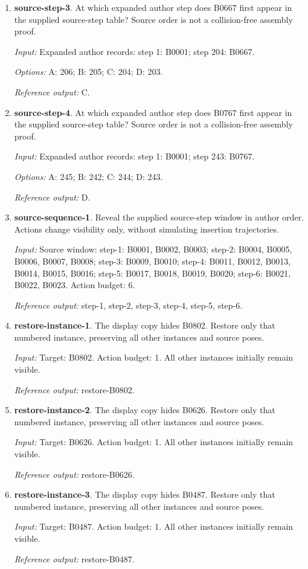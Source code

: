 \begin{enumerate}
\item \textbf{source-step-3}. At which expanded author step does B0667 first appear in the supplied source-step table? Source order is not a collision-free assembly proof.\par {\small \textit{Input:} Expanded author records: step 1: B0001; step 204: B0667. \par\textit{Options:} A: 206; B: 205; C: 204; D: 203. \par\textit{Reference output:} C.}
\item \textbf{source-step-4}. At which expanded author step does B0767 first appear in the supplied source-step table? Source order is not a collision-free assembly proof.\par {\small \textit{Input:} Expanded author records: step 1: B0001; step 243: B0767. \par\textit{Options:} A: 245; B: 242; C: 244; D: 243. \par\textit{Reference output:} D.}
\item \textbf{source-sequence-1}. Reveal the supplied source-step window in author order. Actions change visibility only, without simulating insertion trajectories.\par {\small \textit{Input:} Source window: step-1: B0001, B0002, B0003; step-2: B0004, B0005, B0006, B0007, B0008; step-3: B0009, B0010; step-4: B0011, B0012, B0013, B0014, B0015, B0016; step-5: B0017, B0018, B0019, B0020; step-6: B0021, B0022, B0023. Action budget: 6. \par\textit{Reference output:} step-1, step-2, step-3, step-4, step-5, step-6.}
\item \textbf{restore-instance-1}. The display copy hides B0802. Restore only that numbered instance, preserving all other instances and source poses.\par {\small \textit{Input:} Target: B0802. Action budget: 1. All other instances initially remain visible. \par\textit{Reference output:} restore-B0802.}
\item \textbf{restore-instance-2}. The display copy hides B0626. Restore only that numbered instance, preserving all other instances and source poses.\par {\small \textit{Input:} Target: B0626. Action budget: 1. All other instances initially remain visible. \par\textit{Reference output:} restore-B0626.}
\item \textbf{restore-instance-3}. The display copy hides B0487. Restore only that numbered instance, preserving all other instances and source poses.\par {\small \textit{Input:} Target: B0487. Action budget: 1. All other instances initially remain visible. \par\textit{Reference output:} restore-B0487.}
\end{enumerate}
\clearpage
